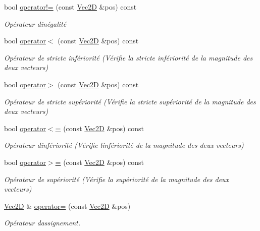 \begin{DoxyCompactItemize}
bool \hyperlink{classns_graphics_1_1_vec2_d_affaed949190e8cb5a3c8f9813b31eb0d}{operator!=} (const \hyperlink{classns_graphics_1_1_vec2_d}{Vec2D} \&pos) const
\begin{DoxyCompactList}\small\item\em Opérateur d\textquotesingle{}inégalité \end{DoxyCompactList}\item 
bool \hyperlink{classns_graphics_1_1_vec2_d_accfe96cfa5b8495a0b14c7087068064e}{operator$<$} (const \hyperlink{classns_graphics_1_1_vec2_d}{Vec2D} \&pos) const
\begin{DoxyCompactList}\small\item\em Opérateur de stricte infériorité (Vérifie la stricte infériorité de la magnitude des deux vecteurs) \end{DoxyCompactList}\item 
bool \hyperlink{classns_graphics_1_1_vec2_d_a30da0e7984d8c3e7a66bbdcdcc24c9cb}{operator$>$} (const \hyperlink{classns_graphics_1_1_vec2_d}{Vec2D} \&pos) const
\begin{DoxyCompactList}\small\item\em Opérateur de stricte supériorité (Vérifie la stricte supériorité de la magnitude des deux vecteurs) \end{DoxyCompactList}\item 
bool \hyperlink{classns_graphics_1_1_vec2_d_afd5e0e3ba77ef971f8d022d69a4a2647}{operator$<$=} (const \hyperlink{classns_graphics_1_1_vec2_d}{Vec2D} \&pos) const
\begin{DoxyCompactList}\small\item\em Opérateur d\textquotesingle{}infériorité (Vérifie l\textquotesingle{}infériorité de la magnitude des deux vecteurs) \end{DoxyCompactList}\item 
bool \hyperlink{classns_graphics_1_1_vec2_d_a478dad2852611070874c6c9e5663b570}{operator$>$=} (const \hyperlink{classns_graphics_1_1_vec2_d}{Vec2D} \&pos) const
\begin{DoxyCompactList}\small\item\em Opérateur de supériorité (Vérifie la supériorité de la magnitude des deux vecteurs) \end{DoxyCompactList}\item 
\hyperlink{classns_graphics_1_1_vec2_d}{Vec2D} \& \hyperlink{classns_graphics_1_1_vec2_d_a041926192c1d2c579b12dcf1eb1725d5}{operator=} (const \hyperlink{classns_graphics_1_1_vec2_d}{Vec2D} \&pos)
\begin{DoxyCompactList}\small\item\em Opérateur d\textquotesingle{}assignement. \end{DoxyCompactList}\item 

\end{DoxyCompactItemize}
